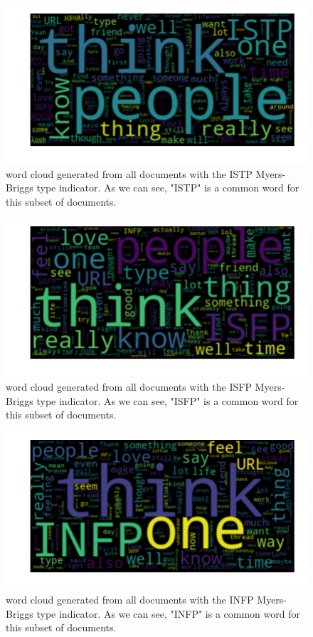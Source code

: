 \begin{figure}[htp] 
  \caption{word cloud generated from all documents with the ISTP Myers-Briggs type indicator. As we can see, "ISTP" is a common word for this subset of documents.}
  \label{fig:wordcloud-ISTP}
  \includegraphics[scale=0.65]{wordclouds/wordcloud_ISTP.pdf}
\end{figure}

\begin{figure}[htp] 
  \caption{word cloud generated from all documents with the ISFP Myers-Briggs type indicator. As we can see, "ISFP" is a common word for this subset of documents.}
  \label{fig:wordcloud-ISFP}
  \includegraphics[scale=0.65]{wordclouds/wordcloud_ISFP.pdf}
\end{figure}

\begin{figure}[htp] 
  \caption{word cloud generated from all documents with the INFP Myers-Briggs type indicator. As we can see, "INFP" is a common word for this subset of documents.}
  \label{fig:wordcloud-INFP}
  \includegraphics[scale=0.65]{wordclouds/wordcloud_INFP.pdf}
\end{figure}

